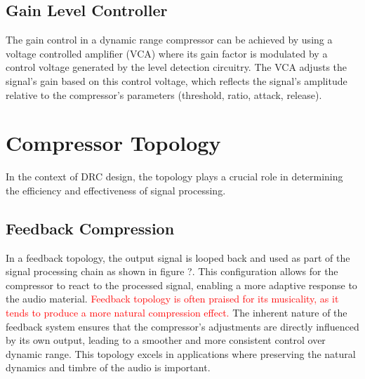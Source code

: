 \documentclass[10pt]{article}
\begin{document}
\begin{multicols*}{2}
            \subsection{Gain Level Controller}
                The gain control in a dynamic range compressor can be achieved by using a voltage controlled amplifier (VCA) where its gain factor is modulated by a control voltage generated by the level detection circuitry. The VCA adjusts the signal's gain based on this control voltage, which reflects the signal's amplitude relative to the compressor's parameters (threshold, ratio, attack, release).
            
        \section{Compressor Topology}
            In the context of DRC design, the topology plays a crucial role in determining the efficiency and effectiveness of signal processing.

            \subsection{Feedback Compression}  
                In a feedback topology, the output signal is looped back and used as part of the signal processing chain as shown in figure ?. This configuration allows for the compressor to react to the processed signal, enabling a more adaptive response to the audio material. \textcolor{red}{Feedback topology is often praised for its musicality, as it tends to produce a more natural compression effect.} The inherent nature of the feedback system ensures that the compressor's adjustments are directly influenced by its own output, leading to a smoother and more consistent control over dynamic range. This topology excels in applications where preserving the natural dynamics and timbre of the audio is important.
                
                \noindent
                \begin{minipage}{\linewidth}

                    \centering

\end{minipage}
\end{multicols*}
\end{document}
